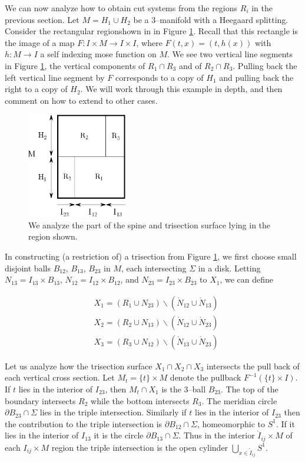 \documentclass[12pt]{amsart}
\newcommand{\del}{\partial }
\theoremstyle{definition}
\theoremstyle{remark}
\begin{document}
We can now analyze how to obtain cut systems from the regions $R_i$ in the previous section.  Let $M = H_1 \cup H_2$ be a 3--manifold with a Heegaard splitting.  Consider the rectangular regionshown in in Figure \ref{sectionbreakdown}.  Recall that this rectangle is the image of a map $F\colon I \times M \to I \times I$, where $F(t,x) = (t,h(x))$ with $h\colon M \to I$ a self indexing mose function on $M$.  We see two vertical line segments in Figure \ref{sectionbreakdown}, the vertical components of $R_1 \cap R_3$ and of $R_2 \cap R_3$.  Pulling back the left vertical line segment by $F$ corresponds to a copy of $H_1$ and pulling back the right to a copy of $H_2$.  We will work through this example in depth, and then comment on how to extend to other cases.  

\begin{figure}[h]
\centering
\includegraphics[height=1.8in]{MxS1_section.png}
\caption{We analyze the part of the spine and trisection surface lying in the region shown.}
\label{sectionbreakdown}
\end{figure}

In constructing (a restriction of) a trisection from Figure \ref{sectionbreakdown}, we first choose small disjoint balls $B_{12}$, $B_{13}$, $B_{23}$ in $M$, each intersecting $\Sigma$ in a disk.  Letting $N_{13} = I_{13} \times B_{13}$, $N_{12} = I_{12} \times B_{12}$, and $N_{23} = I_{23} \times B_{23}$ to $X_1$, we can define

\begin{align*}
&X_1 = (R_1 \cup N_{23}) \backslash (\mathring N_{12} \cup \mathring N_{13}) \\
&X_2 = (R_2 \cup N_{13}) \backslash (\mathring N_{12} \cup \mathring N_{23}) \\
&X_3 = (R_3 \cup N_{12}) \backslash (\mathring N_{13} \cup \mathring N_{23}) 
\end{align*}

Let us analyze how the trisection surface $X_1 \cap X_2 \cap X_3$ intersects the pull back of each vertical cross section.  Let $M_t = \{t\} \times M$ denote the pullback $F^{-1}(\{t\} \times I)$.  If $t$ lies in the interior of $I_{23}$, then $M_t \cap X_1$ is the 3--ball $B_{23}$.  The top of the boundary intersects $R_2$ while the bottom intersects $R_3$.  The meridian circle $\del B_{23} \cap \Sigma$ lies in the triple intersection.  Similarly if $t$ lies in the interior of $I_{23}$ then the contribution to the triple intersection is $\del B_{12} \cap \Sigma$, homeomorphic to $S^1$.  If it lies in the interior of $I_{13}$ it is the circle $\del B_{13} \cap \Sigma$.  Thus in the interior $\mathring I_{ij} \times M$ of each $I_{ij} \times M$ region the triple intersection is the open cylinder $\bigcup_{x \in \mathring I_{ij}} S^1$.  
\end{document}
